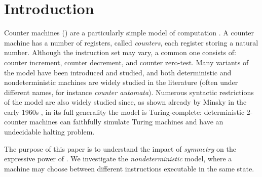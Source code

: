 


\bigskip

\section{Introduction}

Counter machines () are a particularly simple
model of computation \cite{Minsky67}.
A counter machine has a number of registers, called \emph{counters},
each register storing a natural number.
Although the instruction set may vary, 
a common one consists of: counter increment, 
counter decrement, and counter zero-test. 
Many variants of the model have been introduced and studied,
and both deterministic and nondeterministic 
machines are widely studied in the literature 
(often under different names, for instance 
\emph{counter automata}).
Numerous syntactic restrictions of the model are also widely
studied \cite{HKOW09,Ibarra78,HopcroftPansiot,FS00}
since,
as shown already by Minsky in the early 1960s \cite{Minsky61},
in its full generality the model is Turing-complete:
deterministic 2-counter machines can faithfully simulate Turing machines
and have an undecidable halting problem. 

The purpose of this paper is to understand the impact of
\emph{symmetry} on the expressive power of . %
We investigate the \emph{nondeterministic} model, where
a machine may choose between different instructions executable
in the same state.

